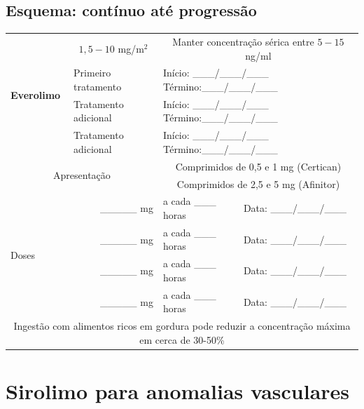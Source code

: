 \documentclass[11pt,a4paper,oldfontcommands]{memoir}
\begin{document}
\subsection{Esquema: contínuo até progressão}
\begin{center}
\begin{table}[H]
	\begin{tabular}{p{2.0cm}|p{4.0cm}|p{5.0cm}p{3.5cm}}
    \hline
		\multirow{4}{*}{\textbf{Everolimo}}&\multicolumn{1}{c|}{\(1,5 - 10\) mg/m\(^2\)}&\multicolumn{2}{c}{Manter concentração sérica entre \(5-15\) ng/ml}\\
		{}&{Primeiro tratamento}&\multicolumn{2}{l}{Início: \_\_\_/\_\_\_/\_\_\_ Término:\_\_\_/\_\_\_/\_\_\_}\\
		{}&{Tratamento adicional}&\multicolumn{2}{l}{Início: \_\_\_/\_\_\_/\_\_\_ Término:\_\_\_/\_\_\_/\_\_\_}\\
		{}&{Tratamento adicional}&\multicolumn{2}{l}{Início: \_\_\_/\_\_\_/\_\_\_ Término:\_\_\_/\_\_\_/\_\_\_}\\
    \hline
		\multicolumn{2}{c|}{\multirow{2}{*}{Apresentação}}&\multicolumn{2}{c}{Comprimidos de 0,5 e 1 mg (Certican)}\\
		\multicolumn{2}{c|}{}&\multicolumn{2}{c}{Comprimidos de 2,5 e 5 mg (Afinitor)}\\
    \hline
		\multirow{4}{*}{Doses}&\multicolumn{1}{r}{\_\_\_\_\_ mg}&{a cada \_\_\_ horas}&{Data: \_\_\_/\_\_\_/\_\_\_}\\
		{}&\multicolumn{1}{r}{\_\_\_\_\_ mg}&{a cada \_\_\_ horas}&{Data: \_\_\_/\_\_\_/\_\_\_}\\
		{}&\multicolumn{1}{r}{\_\_\_\_\_ mg}&{a cada \_\_\_ horas}&{Data: \_\_\_/\_\_\_/\_\_\_}\\
		{}&\multicolumn{1}{r}{\_\_\_\_\_ mg}&{a cada \_\_\_ horas}&{Data: \_\_\_/\_\_\_/\_\_\_}\\
    \hline
        \multicolumn{4}{c}{Ingestão com alimentos ricos em gordura  pode reduzir a concentração máxima em cerca de 30-50\%}\\
    \hline
\end{tabular}
\end{table}
\end{center}
\clearpage
\section{Sirolimo para anomalias vasculares}
{\let\thefootnote\relax{}}
\end{document}
